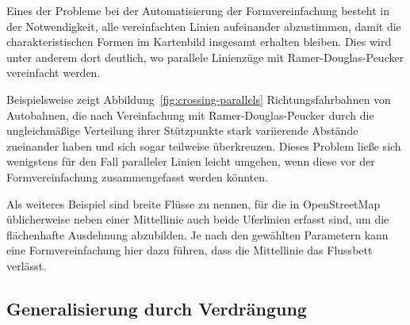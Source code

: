 \documentclass[../main/thesis.tex]{subfiles}
\begin{document}
Eines der Probleme bei der Automatisierung der Formvereinfachung besteht in der Notwendigkeit, alle vereinfachten Linien aufeinander abzustimmen, damit die charakteristischen Formen im Kartenbild insgesamt erhalten bleiben. 
Dies wird unter anderem dort deutlich, wo parallele Linienzüge mit Ramer-Douglas-Peucker vereinfacht werden.

Beispielsweise zeigt Abbildung~\ref{fig:crossing-parallels} Richtungsfahrbahnen von Autobahnen, die nach Vereinfachung mit Ramer-Douglas-Peucker durch die ungleichmäßige Verteilung ihrer Stützpunkte stark variierende Abstände zueinander haben und sich sogar teilweise überkreuzen.
Dieses Problem ließe sich wenigstens für den Fall paralleler Linien leicht umgehen, wenn diese vor der Formvereinfachung zusammengefasst werden könnten.

Als weiteres Beispiel sind breite Flüsse zu nennen, für die in OpenStreetMap üblicherweise neben einer Mittellinie auch beide Uferlinien erfasst sind, um die flächenhafte Ausdehnung abzubilden.
Je nach den gewählten Parametern kann eine Formvereinfachung hier dazu führen, dass die Mittellinie das Flussbett verlässt. 



\FloatBarrier
\subsection{Generalisierung durch Verdrängung}
\end{document}
